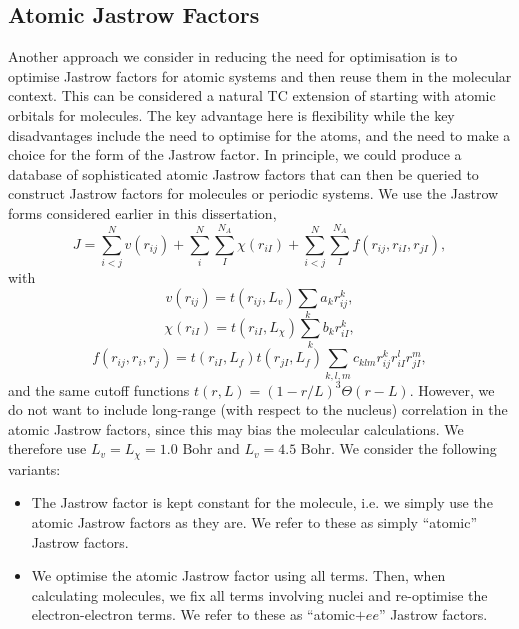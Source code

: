 \subsection{Atomic Jastrow Factors}

Another approach we consider in reducing the need for optimisation is to optimise Jastrow factors for atomic systems and then reuse them in the molecular context. This can be considered a natural TC extension of starting with atomic orbitals for molecules. The key advantage here is flexibility while the key disadvantages include the need to optimise for the atoms, and the need to make a choice for the form of the Jastrow factor. In principle, we could produce a database of sophisticated atomic Jastrow factors that can then be queried to construct Jastrow factors for molecules or periodic systems. We use the Jastrow forms considered earlier in this dissertation, \begin{equation}
    \label{eq:jastrow-3}
    J = \sum_{i<j}^Nv(r_{ij}) + \sum_i^N\sum_I^{N_A}\chi(r_{iI}) + \sum_{i<j}^N\sum_I^{N_A}f(r_{ij}, r_{iI}, r_{jI}),
\end{equation}
with
\begin{equation}
    \label{eq:dtn-jastrow-ee-3}
    v(r_{ij})    = t(r_{ij},L_v)
                    \sum_{k} a_k r_{ij}^k ,
\end{equation}
\begin{equation}
    \label{eq:dtn-jastrow-en-3}
    \chi(r_{iI}) = t(r_{iI},L_\chi)
    \sum_{k} b_k r_{iI}^k ,
\end{equation}
\begin{equation}
    \label{eq:dtn-jastrow-een-3}
    f(r_{ij}, r_{i}, r_{j}) = t(r_{iI},L_f) t(r_{jI},L_f)
    \sum_{k,l,m} c_{klm}
    r_{ij}^k r_{iI}^l r_{jI}^m ,
\end{equation}
and the same cutoff functions $t(r,L) = (1-r/L)^3
\Theta(r-L)$. However, we do not want to include long-range (with respect to the nucleus) correlation in the atomic Jastrow factors, since this may bias the molecular calculations. We therefore use $L_v=L_\chi=1.0$ Bohr and $L_{v}=4.5$ Bohr. We consider the following variants:
\begin{itemize}
    \item The Jastrow factor is kept constant for the molecule, i.e. we simply use the atomic Jastrow factors as they are. We refer to these as simply ``atomic'' Jastrow factors.
    \item We optimise the atomic Jastrow factor using all terms. Then, when calculating molecules, we fix all terms involving nuclei and re-optimise the electron-electron terms. We refer to these as ``atomic$+ee$'' Jastrow factors.
\end{itemize}

